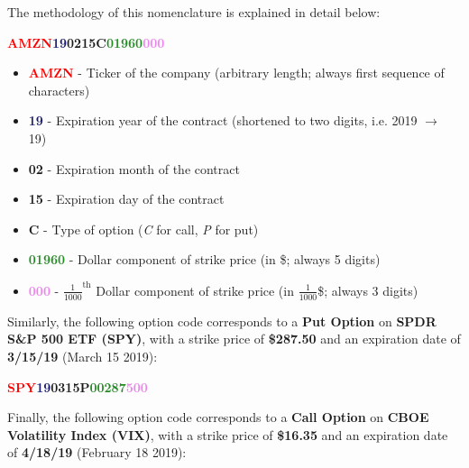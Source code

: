 \documentclass[10pt]{article}
\begin{document}
        The methodology of this nomenclature is explained in detail below:
    
        \begin{center}
            \textbf{\textcolor{red}{AMZN}\textcolor{MidnightBlue}{19}\textcolor{Bittersweet}{02}\textcolor{YellowOrange}{15}\textcolor{RoyalPurple}{C}\textcolor{ForestGreen}{01960}\textcolor{violet}{000}}
        \end{center}
    
        \begin{itemize}
            \item \textbf{\textcolor{red}{AMZN}} - Ticker of the company (arbitrary length; always first sequence of characters)
            \item \textbf{\textcolor{MidnightBlue}{19}} - Expiration year of the contract (shortened to two digits, i.e. 2019 $\rightarrow$ 19)
            \item \textbf{\textcolor{Bittersweet}{02}} - Expiration month of the contract
            \item \textbf{\textcolor{YellowOrange}{15}} - Expiration day of the contract
            \item \textbf{\textcolor{RoyalPurple}{C}} - Type of option (\textit{C} for call, \textit{P} for put)
            \item \textbf{\textcolor{ForestGreen}{01960}} - Dollar component of strike price (in \$; always 5 digits)
            \item \textbf{\textcolor{violet}{000}} - ${\frac{1}{1000}}^\text{th}$ Dollar component of strike price (in $\frac{1}{1000}$\$; always 3 digits)
        \end{itemize}
    
        Similarly, the following option code corresponds to a \textbf{Put Option} on \textbf{SPDR S\&P 500 ETF (SPY)}, with a strike price of \textbf{\$287.50} and an expiration date of \textbf{3/15/19} (March 15 2019):
    
        \begin{center}
            \textbf{\textcolor{red}{SPY}\textcolor{MidnightBlue}{19}\textcolor{Bittersweet}{03}\textcolor{YellowOrange}{15}\textcolor{RoyalPurple}{P}\textcolor{ForestGreen}{00287}\textcolor{violet}{500}}
        \end{center}
    
        Finally, the following option code corresponds to a \textbf{Call Option} on \textbf{CBOE Volatility Index (VIX)}, with a strike price of \textbf{\$16.35} and an expiration date of \textbf{4/18/19} (February 18 2019):
    
\end{document}

